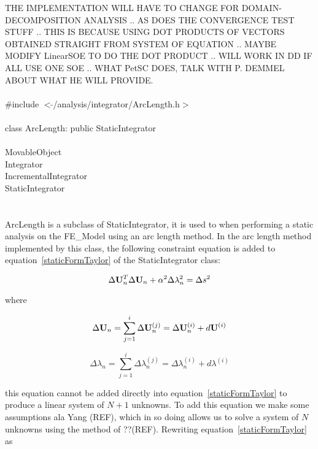 
THE IMPLEMENTATION WILL HAVE TO CHANGE FOR DOMAIN-DECOMPOSITION
ANALYSIS .. AS DOES THE CONVERGENCE TEST STUFF .. THIS IS BECAUSE
USING DOT PRODUCTS OF VECTORS OBTAINED STRAIGHT FROM SYSTEM OF
EQUATION .. MAYBE MODIFY LinearSOE TO DO THE DOT PRODUCT .. WILL 
WORK IN DD IF ALL USE ONE SOE .. WHAT PetSC DOES, TALK WITH P. DEMMEL
ABOUT WHAT HE WILL PROVIDE. \\

   \\
\indent \#include $<\tilde{ }$/analysis/integrator/ArcLength.h$>$  \\

  \\
\indent class ArcLength: public StaticIntegrator  \\

 \\
\indent MovableObject \\
\indent\indent Integrator \\
\indent\indent\indent IncrementalIntegrator \\
\indent\indent\indent\indent StaticIntegrator \\
\indent\indent\indent\indent{} \\

 \\ 
\indent ArcLength is a subclass of StaticIntegrator, it is
used to when performing a static analysis on the FE\_Model using an
arc length method. In the arc length method implemented by this class,
the following constraint equation is added to
equation~\ref{staticFormTaylor} of the StaticIntegrator class: 

\begin{equation}
\Delta {\bf U}_n^T \Delta {\bf U}_n  + \alpha^2 \Delta \lambda_n^2  = \Delta s^2
\end{equation}

where 

\[
\Delta {\bf U}_n = \sum_{j=1}^{i} \Delta {\bf U}_n^{(j)} = \Delta {\bf U}_n^{(i)} +
d{\bf U}^{(i)} 
\]

\[
\Delta \lambda_n = \sum_{j=1}^{i} \Delta \lambda_n^{(j)} = \Delta \lambda_n^{(i)} +
d\lambda^{(i)} 
\]

\noindent this equation cannot be added directly into
equation~\ref{staticFormTaylor} to produce a linear system of $N+1$
unknowns. To add this equation we make some assumptions ala Yang
(REF), which in so doing allows us to solve a system of $N$
unknowns using the method of ??(REF).  Rewriting
equation~\ref{staticFormTaylor} as  

